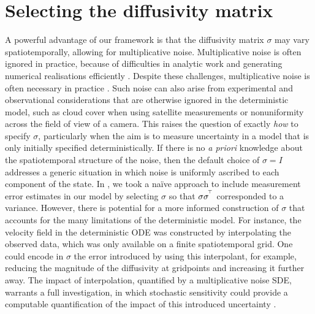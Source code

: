\section{Selecting the diffusivity matrix}\label{sec:disc_sigma}
A powerful advantage of our framework is that the diffusivity matrix \(\sigma\) may vary spatiotemporally, allowing for multiplicative noise.
Multiplicative noise is often ignored in practice, because of difficulties in analytic work \citep{SanchoEtAl_1982_AnalyticalNumericalStudies} and generating numerical realisations efficiently \citep{MoraEtAl_2017_StableNumericalScheme}.
Despite these challenges, multiplicative noise is often necessary in practice \citep[e.g.]{Sura_2003_StochasticAnalysisSouthern,KamenkovichEtAl_2015_PropertiesOriginsAnisotropic}.
Such noise can also arise from experimental and observational considerations that are otherwise ignored in the deterministic model, such as cloud cover when using satellite measurements or nonuniformity across the field of view of a camera.
This raises the question of exactly \emph{how} to specify \(\sigma\), particularly when the aim is to measure uncertainty in a model that is only initially specified deterministically.
If there is no \emph{a priori} knowledge about the spatiotemporal structure of the noise, then the default choice of \(\sigma = I\) addresses a generic situation in which noise is uniformly ascribed to each component of the state.
In , we took a na\"ive approach to include measurement error estimates in our model by selecting \(\sigma\) so that \(\sigma\sigma^{^{\!\top}}\) corresponded to a variance.
However, there is potential for a more informed construction of \(\sigma\) that accounts for the many limitations of the deterministic model.
For instance, the velocity field in the deterministic ODE was constructed by interpolating the observed data, which was only available on a finite spatiotemporal grid.
One could encode in \(\sigma\) the error introduced by using this interpolant, for example, reducing the magnitude of the diffusivity at gridpoints and increasing it further away.
The impact of interpolation, quantified by a multiplicative noise SDE, warrants a full investigation, in which stochastic sensitivity could provide a computable quantification of the impact of this introduced uncertainty \citep{FangEtAl_2020_DisentanglingResolutionPrecision,FangOuellette_2021_AssessingInformationContent}.
